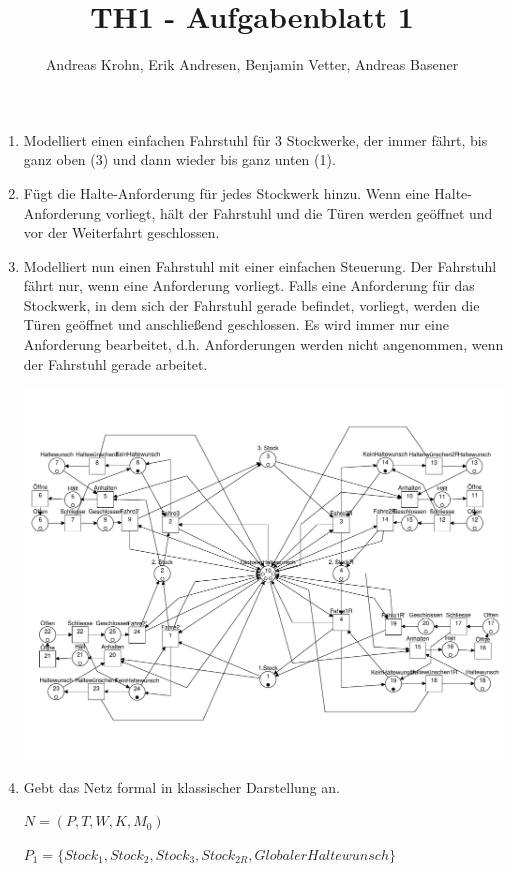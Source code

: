 \documentclass{scrreprt}
\title{TH1 - Aufgabenblatt 1}
\author{Andreas Krohn, Erik Andresen, Benjamin Vetter, Andreas Basener}
\begin{document}
\maketitle

\begin{enumerate}
\item Modelliert einen einfachen Fahrstuhl für 3 Stockwerke, der immer fährt, bis ganz oben (3) und dann wieder bis ganz unten (1).

\item Fügt die Halte-Anforderung für jedes Stockwerk hinzu. Wenn eine Halte-Anforderung vorliegt, hält der Fahrstuhl und die Türen werden geöffnet und vor der Weiterfahrt geschlossen.

\item Modelliert nun einen Fahrstuhl mit einer einfachen Steuerung. Der Fahrstuhl fährt nur, wenn eine Anforderung vorliegt. Falls eine Anforderung für das Stockwerk, in dem sich der Fahrstuhl gerade befindet, vorliegt, werden die Türen geöffnet und anschließend geschlossen. Es wird immer nur eine Anforderung bearbeitet, d.h. Anforderungen werden nicht angenommen, wenn der Fahrstuhl gerade arbeitet.

\includegraphics[width=1\textwidth]{prak_aufg3_fertig_bugfix2.pdf}

\item Gebt das Netz formal in klassischer Darstellung an.

$N = (P, T, W, K, M_0)$

$P_1 = \{ Stock_1, Stock_2, Stock_3, Stock_{2R}, GlobalerHaltewunsch \}$


\end{enumerate}
\end{document}
